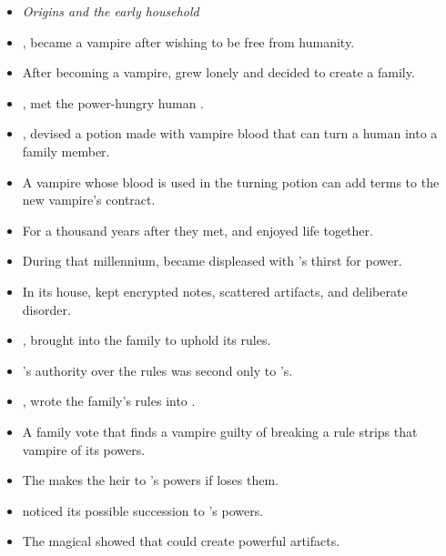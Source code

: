 \MMRelationshipMapHeading
\begin{itemize}
  \item[] \textit{Origins and the early household}

  \item {},  became a vampire after wishing to be free from humanity.
  \item After becoming a vampire,  grew lonely and decided to create a family.
  \item {},  met the power-hungry human .
  \item {},  devised a potion made with vampire blood that can turn a human into a family member.
  \item A vampire whose blood is used in the turning potion can add terms to the new vampire's contract.
  \item For a thousand years after they met,  and  enjoyed life together.
  \item During that millennium,  became displeased with 's thirst for power.
  \item In its house,  kept encrypted notes, scattered artifacts, and deliberate disorder.
  \item {},  brought  into the family to uphold its rules.
  \item {}'s authority over the rules was second only to 's.
  \item {},  wrote the family's rules into .
  \item A family vote that finds a vampire guilty of breaking a rule strips that vampire of its powers.
  \item The  makes  the heir to 's powers if  loses them.
  \item {} noticed its possible succession to 's powers.
  \item The magical  showed  that  could create powerful artifacts.

\end{itemize}
